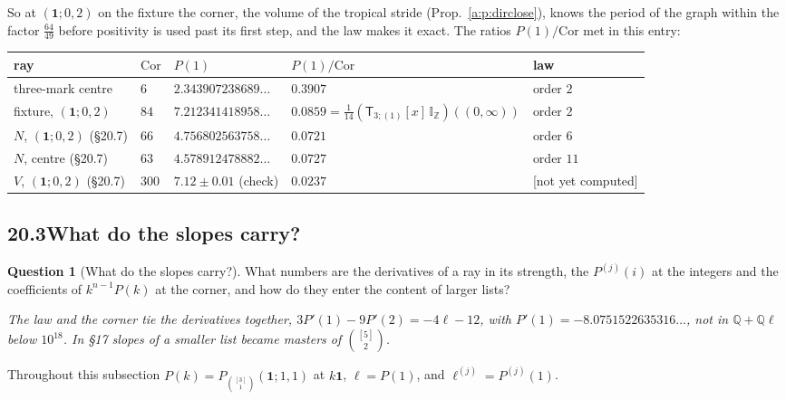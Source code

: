 \documentclass[11pt]{article}
\newcommand{\one}{\mathbf 1}
\newcommand{\sT}{\mathsf T}
\newcommand{\IZ}{\mathbb I_{\mathbb Z}}
\newcommand{\Tx}[3]{(\sT_{#1;(1)}[x]\,#2)((#3,\infty))}
\newcommand{\Pth}{P_{\binom{[3]}1}(\one;1,1)}
\theoremstyle{plain}
\theoremstyle{definition}
\newtheorem{question}[proposition]{Question}
\theoremstyle{remark}
\newcommand{\notyet}{\textup{[not yet computed]}}
\begin{document}
\noindent So at $(\one;0,2)$ on the fixture the corner, the volume of the tropical stride (Prop.~\ref{a:p:dirclose}), knows the period of the graph within the factor $\frac{64}{49}$ before positivity is used past its first step, and the law makes it exact. The ratios $P(1)/\mathrm{Cor}$ met in this entry:
\begin{center}
\small
\begin{tabular}{@{}l l l l l@{}}
\toprule
ray & $\mathrm{Cor}$ & $P(1)$ & $P(1)/\mathrm{Cor}$ & law\\ \midrule
three-mark centre & $6$ & $2.343907238689\ldots$ & $0.3907$ & order $2$\\
fixture, $(\one;0,2)$ & $84$ & $7.212341418958\ldots$ & $0.0859=\frac1{14}\Tx3{\IZ}0$ & order $2$\\
$N$, $(\one;0,2)$ (\S20.7) & $66$ & $4.756802563758\ldots$ & $0.0721$ & order $6$\\
$N$, centre (\S20.7) & $63$ & $4.578912478882\ldots$ & $0.0727$ & order $11$\\
$V$, $(\one;0,2)$ (\S20.7) & $300$ & $7.12\pm0.01$ (check) & $0.0237$ & \notyet\\
\bottomrule
\end{tabular}
\end{center}

\subsection*{20.3\quad What do the slopes carry?}

\begin{question}[What do the slopes carry?]\label{a:q:slopes}
What numbers are the derivatives of a ray in its strength, the $P^{(j)}(i)$ at the integers and the coefficients of $k^{n-1}P(k)$ at the corner, and how do they enter the content of larger lists?
\end{question}

\emph{The law and the corner tie the derivatives together, $3P'(1)-9P'(2)=-4\ell-12$, with $P'(1)=-8.0751522635316\ldots$, not in $\mathbb Q+\mathbb Q\ell$ below $10^{18}$. In \S17 slopes of a smaller list became masters of $\binom{[5]}2$.}

Throughout this subsection $P(k)=\Pth$ at $k\one$, $\ell=P(1)$, and $\ell^{(j)}=P^{(j)}(1)$.
\end{document}

